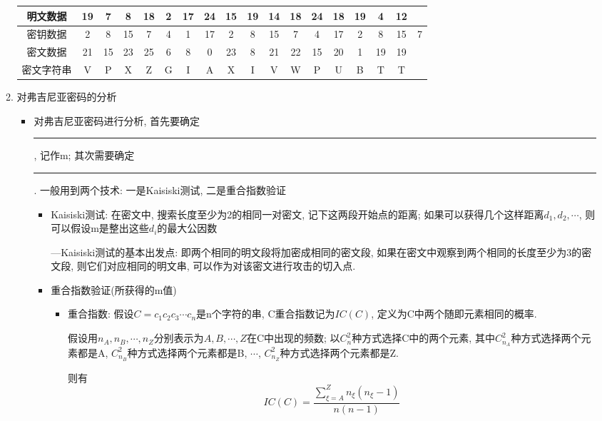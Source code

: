 \documentclass[UTF8]{ctexart}
\newcommand\hl{\bgroup\markoverwith
  {\textcolor{yellow}{\rule[-.5ex]{2pt}{2.5ex}}}\ULon}
\begin{document}
\begin{itemize}
\begin{enumerate}
\begin{itemize}
            \end{itemize}
            \begin{tabular}{|c|c|c|c|c|c|c|c|c|c|c|c|c|c|c|c|c|c|}
                \hline
                明文数据 &19 &7 &8 &18 &2 &17 &24 &15 &19 &14 &18 &24 &18 &19 &4 &12\\
                \hline
                密钥数据 &2 &8 &15 &7 &4 &1 &17 &2 &8 &15 &7 &4 &17 &2 &8 &15 &7\\
                \hline
                \hline
                密文数据 &21 &15 & 23 &25 &6 &8 &0 &23 &8 &21 &22 &15 &20 &1 &19 &19\\
                \hline
                密文字符串 &V &P &X &Z &G &I &A &X &I &V &W &P &U &B &T &T\\
                \hline
            \end{tabular}

            \item 对弗吉尼亚密码的分析
            \begin{itemize}
                \item 对弗吉尼亚密码进行分析, 首先要确定\hl{密钥的长度}, 记作m; 其次需要确定\hl{密钥字符串}. 一般用到两个技术: 一是Kaisiski测试, 二是重合指数验证
                \begin{itemize}
                    \item Kaisiski测试: 在密文中, 搜索长度至少为2的相同一对密文, 记下这两段开始点的距离; 如果可以获得几个这样距离$d_1, d_2, \cdots$, 则可以假设m是整出这些$d_i$的最大公因数

                    ---Kaisiski测试的基本出发点: 即两个相同的明文段将加密成相同的密文段, 如果在密文中观察到两个相同的长度至少为3的密文段, 则它们对应相同的明文串, 可以作为对该密文进行攻击的切入点.

                    \item 重合指数验证(所获得的m值)
                    \begin{itemize}
                        \item 重合指数: 假设$C=c_1c_2c_3\cdots c_n$是n个字符的串, C重合指数记为$IC(C)$, 定义为C中两个随即元素相同的概率.

                            假设用$n_A, n_B, \cdots, n_Z$分别表示为$A, B, \cdots, Z$在C中出现的频数; 以$C_n^2$种方式选择C中的两个元素, 其中$C_{n_A}^2$种方式选择两个元素都是A, $C_{n_B}^2$种方式选择两个元素都是B, $\cdots$, $C_{n_Z}^2$种方式选择两个元素都是Z.

                        则有
                        \begin{equation}
                            IC(C)=\frac{\sum_{\xi=A}^{Z} n_{\xi}(n_{\xi}-1)}{n(n-1)}
                        \end{equation}


\end{itemize}
\end{itemize}
\end{itemize}
\end{enumerate}
\end{itemize}
\end{document}
